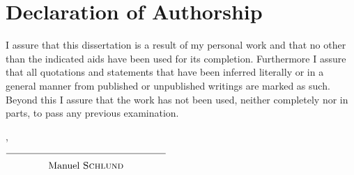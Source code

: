 


\chapter{Declaration of Authorship}

I assure that this dissertation is a result of my personal work and that no other than the indicated aids have been used for its completion. Furthermore I assure that all quotations and statements that have been inferred literally or in a general manner from published or unpublished writings are marked as such. Beyond this I assure that the work has not been used, neither completely nor in parts, to pass any previous examination.

\vspace{20mm}

\noindent \thePlace{}, \theDate{}

\begin{flushright}
  $\overline{~~~~~~~~~~~~~\raisebox{0mm}[5mm]{\theAuthor{}}~~~~~~~~~~~~~}$
\end{flushright}